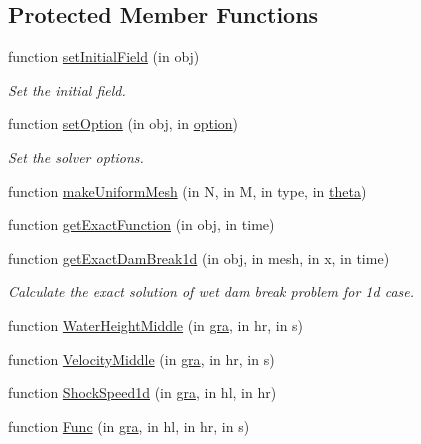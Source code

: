 \subsection*{Protected Member Functions}
\begin{DoxyCompactItemize}
\item 
function \hyperlink{class_dam_break_wet_uniform_mesh2d_a68935f17e053a4373fc8c0b571ee4336}{set\+Initial\+Field} (in obj)
\begin{DoxyCompactList}\small\item\em Set the initial field. \end{DoxyCompactList}\item 
function \hyperlink{class_dam_break_wet_uniform_mesh2d_ac36c3c3e62b645d627e829c9d803d6d7}{set\+Option} (in obj, in \hyperlink{class_ndg_phys_af91f4c54b93504e76b38a5693774dff1}{option})
\begin{DoxyCompactList}\small\item\em Set the solver options. \end{DoxyCompactList}\item 
function \hyperlink{class_dam_break_wet_uniform_mesh2d_ae9f76aca9c0ba165123ec8922a52b56d}{make\+Uniform\+Mesh} (in N, in M, in type, in \hyperlink{class_dam_break_wet_uniform_mesh2d_a03e265102071fb0ea1e1119ec9997457}{theta})
\item 
function \hyperlink{class_dam_break_wet_uniform_mesh2d_a8aecfe5f2891b6a1e53624c3f10654bb}{get\+Exact\+Function} (in obj, in time)
\item 
function \hyperlink{class_dam_break_wet_uniform_mesh2d_ac6d9f50b7edce5ace94f4d06e51596ed}{get\+Exact\+Dam\+Break1d} (in obj, in mesh, in x, in time)
\begin{DoxyCompactList}\small\item\em Calculate the exact solution of wet dam break problem for 1d case. \end{DoxyCompactList}\item 
function \hyperlink{class_dam_break_wet_uniform_mesh2d_a1ccc127f880cb337dc47e2f756f47232}{Water\+Height\+Middle} (in \hyperlink{class_dam_break_wet_uniform_mesh2d_a84a7e54c850fd637d1e6aebe40f98bc5}{gra}, in hr, in s)
\item 
function \hyperlink{class_dam_break_wet_uniform_mesh2d_a19bcd305041b1cba5ce3bfd9c341543f}{Velocity\+Middle} (in \hyperlink{class_dam_break_wet_uniform_mesh2d_a84a7e54c850fd637d1e6aebe40f98bc5}{gra}, in hr, in s)
\item 
function \hyperlink{class_dam_break_wet_uniform_mesh2d_a44b59a7b7adb78111db0f54274e65d44}{Shock\+Speed1d} (in \hyperlink{class_dam_break_wet_uniform_mesh2d_a84a7e54c850fd637d1e6aebe40f98bc5}{gra}, in hl, in hr)
\item 
function \hyperlink{class_dam_break_wet_uniform_mesh2d_a7a235656dc280fa7b1e065064be8e86e}{Func} (in \hyperlink{class_dam_break_wet_uniform_mesh2d_a84a7e54c850fd637d1e6aebe40f98bc5}{gra}, in hl, in hr, in s)
\end{DoxyCompactItemize}
